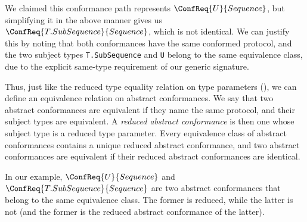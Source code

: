 \documentclass[../generics]{subfiles}
\begin{document}
We claimed this conformance path represents $\ConfReq{U}{Sequence}$, but simplifying it in the above manner gives us $\ConfReq{T.SubSequence}{Sequence}$, which is not identical. We can justify this by noting that both conformances have the same conformed protocol, and the two subject types \texttt{T.SubSequence} and \texttt{U} belong to the same equivalence class, due to the explicit same-type requirement of our generic signature.

Thus, just like the reduced type equality relation on type parameters (), we can define an equivalence relation on abstract conformances. We say that two abstract conformances are equivalent if they name the same protocol, and their subject types are equivalent. A \emph{reduced abstract conformance} is then one whose subject type is a reduced type parameter. Every equivalence class of abstract conformances contains a unique reduced abstract conformance, and two abstract conformances are equivalent if their reduced abstract conformances are identical.

In our example, $\ConfReq{U}{Sequence}$ and $\ConfReq{T.SubSequence}{Sequence}$ are two abstract conformances that belong to the same equivalence class. The former is reduced, while the latter is not (and the former is the reduced abstract conformance of the latter).
\end{document}
